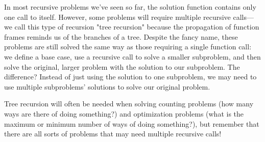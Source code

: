 \begin{blocksection}
In most recursive problems we've seen so far, the solution function contains only one call to itself. However, some problems will require multiple recursive calls---we call this type of recursion "tree recursion" because the propagation of function frames reminds us of the branches of a tree. Despite the fancy name, these problems are still solved the same way as those requiring a single function call: we define a base case, use a recursive call to solve a smaller subproblem, and then solve the original, larger problem with the solution to our subproblem. The difference? Instead of just using the solution to one subproblem, we may need to use multiple subproblems' solutions to solve our original problem. 

Tree recursion will often be needed when solving counting problems (how many ways are there of doing something?) and optimization problems (what is the maximum or minimum number of ways of doing something?), but remember that there are all sorts of problems that may need multiple recursive calls! 

\end{blocksection}

